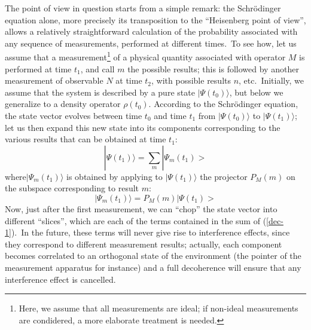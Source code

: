 \documentclass[12pt,onecolumn]{article}%
\begin{document}
The point of view in question starts from a simple remark: the Schr\"{o}dinger
equation alone, more precisely its transposition to the ``Heisenberg point of
view'', allows a relatively straightforward calculation of the probability
associated with any sequence of measurements, performed at different
times.\ To see how, let us assume that a measurement\footnote{Here, we assume
that all measurements are ideal; if non-ideal measurements are condidered, a
more elaborate treatment is needed.} of a physical quantity associated with
operator $M$ is performed at time $t_{1}$, and call $m$ the possible results;
this is followed by another measurement of observable $N$ at time $t_{2}$,
with possible results $n$, etc.\ Initially, we assume that the system is
described by a pure state $|\Psi(t_{0})\rangle$, but below we generalize to a
density operator $\rho(t_{0})$. According to the Schr\"{o}dinger equation, the
state vector evolves between time $t_{0}$ and time $t_{1}$ from $|
\Psi(t_{0})\rangle$ to $|\Psi(t_{1})\rangle$; let us then expand this new state into
its components corresponding to the various results that can be obtained at
time $t_{1}$:%
\begin{equation}
|\Psi(t_{1})\rangle = \sum_{m}|\Psi_{m}(t_{1})> \label{dec-1}%
\end{equation}
where$|\Psi_{m}(t_{1})\rangle$ is obtained by applying to $|\Psi(t_{1})\rangle$ the
projector $P_{M}(m)$ on the subspace corresponding to result $m$:
\begin{equation}
|\Psi_{m}(t_{1})\rangle = P_{M}(m)|\Psi(t_{1})> \label{dec-2}%
\end{equation}
Now, just after the first measurement, we can ``chop'' the state vector into
different ``slices'', which are each of the terms contained in the sum of
(\ref{dec-1}).\ In the future, these terms will never give rise to
interference effects, since they correspond to different measurement results;
actually, each component becomes correlated to an orthogonal state of the
environment (the pointer of the measurement apparatus for instance) and a full
decoherence will ensure that any interference effect is cancelled.
\end{document}
